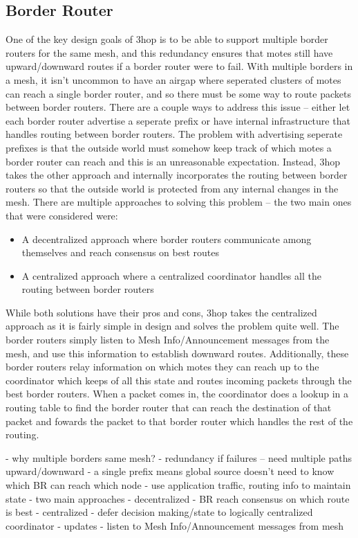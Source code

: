 \subsection{Border Router}
One of the key design goals of 3hop is to be able to support multiple border routers for the same mesh, and this redundancy ensures that motes still have upward/downward routes if a border router were to fail.
With multiple borders in a mesh, it isn't uncommon to have an airgap where seperated clusters of motes can reach a single border router, and so there must be some way to route packets between border routers.
There are a couple ways to address this issue -- either let each border router advertise a seperate prefix or have internal infrastructure that handles routing between border routers.
The problem with advertising seperate prefixes is that the outside world must somehow keep track of which motes a border router can reach and this is an unreasonable expectation.
Instead, 3hop takes the other approach and internally incorporates the routing between border routers so that the outside world is protected from any internal changes in the mesh.
There are multiple approaches to solving this problem -- the two main ones that were considered were:
\begin{itemize}
\item A decentralized approach where border routers communicate among themselves and reach consensus on best routes
\item A centralized approach where a centralized coordinator handles all the routing between border routers 
\end{itemize}
While both solutions have their pros and cons, 3hop takes the centralized approach as it is fairly simple in design and solves the problem quite well.
The border routers simply listen to Mesh Info/Announcement messages from the mesh, and use this information to establish downward routes.
Additionally, these border routers relay information on which motes they can reach up to the coordinator which keeps of all this state and routes incoming packets through the best border routers.
When a packet comes in, the coordinator does a lookup in a routing table to find the border router that can reach the destination of that packet and fowards the packet to that border router which handles the rest of the routing.

\if
- why multiple borders same mesh?
    - redundancy if failures -- need multiple paths upward/downward
    - a single prefix means global source doesn't need to know which BR can reach which node
    - use application traffic, routing info to maintain state
- two main approaches
    - decentralized
        - BR reach consensus on which route is best
    - centralized
        - defer decision making/state to logically centralized coordinator
- updates
    - listen to Mesh Info/Announcement messages from mesh
\fi




